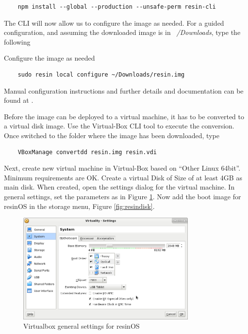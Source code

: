 \documentclass[]{scrartcl}
\begin{document}
\begin{verbatim}
	npm install --global --production --unsafe-perm resin-cli
\end{verbatim}

The CLI will now allow us to configure the image as needed. For a guided configuration, and assuming the downloaded image is in \textit{~/Downloads}, type the following 

Configure the image as needed
\begin{verbatim}
	sudo resin local configure ~/Downloads/resin.img
\end{verbatim}

Manual configuration instructions and further details and documentation can be found at \cite{resin02}.
 
Before the image can be deployed to a virtual machine, it has to be converted to a virtual disk image. 
Use the Virtual-Box CLI tool to execute the conversion. Once switched to the folder where the image has been downloaded, type
\begin{verbatim}
	VBoxManage convertdd resin.img resin.vdi
\end{verbatim}

Next, create new virtual machine in Virtual-Box based on ``Other Linux 64bit''. Minimum requirements are OK. Create a virtual Disk of Size of at least 4GB as main disk. 
When created, open the settings dialog for the virtual machine. In general settings, set the parameters as in Figure \ref{fig:resingen}. Now add the boot image for resinOS in the storage menu, Figure \ref{fig:resindisk}.

\begin{figure}[t]
	\centering
	\includegraphics[width=0.8\textwidth]{resin-vbox}
	\caption{Virtualbox general settings for resinOS}
	\label{fig:resingen}
\end{figure}
\end{document}
